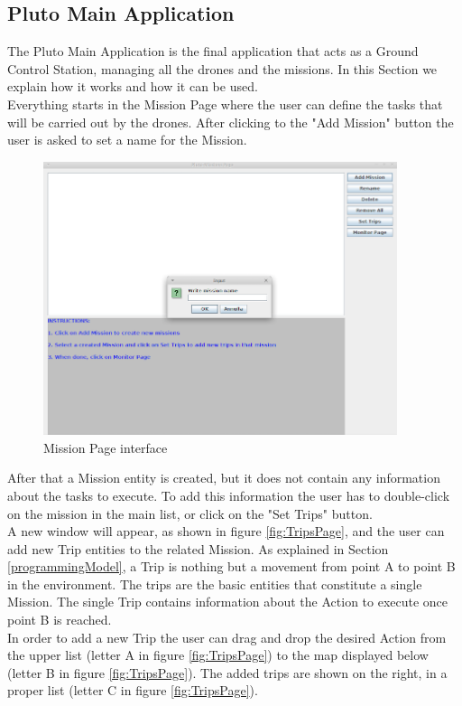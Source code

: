 \subsection{Pluto Main Application}
\label{plutoMainApp}

The Pluto Main Application is the final application that acts as a Ground Control Station, managing all the drones and the missions.
In this Section we explain how it works and how it can be used.
\\
Everything starts in the Mission Page where the user can define the tasks that will be carried out by the drones. After clicking to the "Add Mission" button the user is asked to set a name for the Mission.
\\

\begin{figure}[h!]
  \centering
  \includegraphics[width=\linewidth,height=8cm]
  {pictures/MissionPage.png}
  \caption{Mission Page interface}
  \label{fig:MissionPage}
\end{figure}

After that a Mission entity is created, but it does not contain any information about the tasks to execute. 
To add this information the user has to double-click on the mission in the main list, or click on the "Set Trips" button.
\\
A new window will appear, as shown in figure \ref{fig:TripsPage}, and the user can add new Trip entities to the related Mission.
As explained in Section \ref{programmingModel}, a Trip is nothing but a movement from point A to point B in the environment. 
The trips are the basic entities that constitute a single Mission. 
The single Trip contains information about the Action to execute once point B is reached.
\\
In order to add a new Trip the user can drag and drop the desired Action from the upper list (letter A in figure \ref{fig:TripsPage}) to the map displayed below (letter B in figure \ref{fig:TripsPage}).
The added trips are shown on the right, in a proper list (letter C in figure \ref{fig:TripsPage}).
\\

